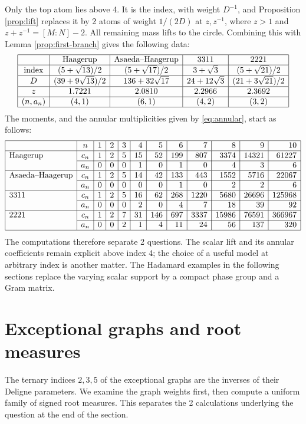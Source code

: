 \documentclass[11pt,reqno]{amsart}
\theoremstyle{definition}
\numberwithin{equation}{section}
\begin{document}
Only the top atom lies above 4. It is the index, with weight $D^{-1}$, and Proposition \ref{prop:lift} replaces it by 2 atoms of weight $1/(2D)$ at $z,z^{-1}$, where $z>1$ and $z+z^{-1}=[M:N]-2$. All remaining mass lifts to the circle. Combining this with Lemma \ref{prop:first-branch} gives the following data:
$$\begin{array}{|c|c|c|c|c|}\hline
&{\rm Haagerup}&\mbox{Asaeda--Haagerup}&3311&2221\\\hline
{\rm index}&(5+\sqrt{13})/2&(5+\sqrt{17})/2&3+\sqrt3&(5+\sqrt{21})/2\\\hline
D&(39+9\sqrt{13})/2&136+32\sqrt{17}&24+12\sqrt3&(21+3\sqrt{21})/2\\\hline
z&1.7221&2.0810&2.2966&2.3692\\\hline
(n,a_n)&(4,1)&(6,1)&(4,2)&(3,2)\\\hline
\end{array}$$
The moments, and the annular multiplicities given by \eqref{eq:annular}, start as follows:
$$\begin{array}{|l|c|r|r|r|r|r|r|r|r|r|r|}\hline
&n&1&2&3&4&5&6&7&8&9&10\\\hline
{\rm Haagerup}&c_n&1&2&5&15&52&199&807&3374&14321&61227\\\cline{2-12}
&a_n&0&0&0&1&0&1&0&4&3&6\\\hline
\mbox{Asaeda--Haagerup}&c_n&1&2&5&14&42&133&443&1552&5716&22067\\\cline{2-12}
&a_n&0&0&0&0&0&1&0&2&2&6\\\hline
3311&c_n&1&2&5&16&62&268&1220&5680&26696&125968\\\cline{2-12}
&a_n&0&0&0&2&0&4&7&18&39&92\\\hline
2221&c_n&1&2&7&31&146&697&3337&15986&76591&366967\\\cline{2-12}
&a_n&0&0&2&1&4&11&24&56&137&320\\\hline
\end{array}$$
The computations therefore separate 2 questions. The scalar lift and its annular coefficients remain explicit above index 4; the choice of a useful model at arbitrary index is another matter. The Hadamard examples in the following sections replace the varying scalar support by a compact phase group and a Gram matrix.

\section{Exceptional graphs and root measures}\label{sec:deligne}

The ternary indices $2,3,5$ of the exceptional graphs are the inverses of their Deligne parameters. We examine the graph weights first, then compute a uniform family of signed root measures. This separates the 2 calculations underlying the question at the end of the section.
\end{document}
